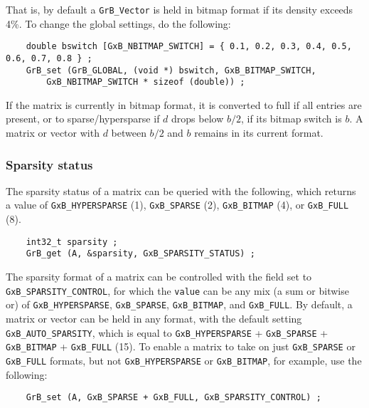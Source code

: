 That is, by default a \verb'GrB_Vector' is held in bitmap format if its density
exceeds 4\%.  To change the global settings, do the following:

{\footnotesize
\begin{verbatim}
    double bswitch [GxB_NBITMAP_SWITCH] = { 0.1, 0.2, 0.3, 0.4, 0.5, 0.6, 0.7, 0.8 } ;
    GrB_set (GrB_GLOBAL, (void *) bswitch, GxB_BITMAP_SWITCH,
        GxB_NBITMAP_SWITCH * sizeof (double)) ;
\end{verbatim}
}

If the matrix is currently in bitmap format, it is converted to full if all
entries are present, or to sparse/hypersparse if $d$ drops below $b/2$, if its
bitmap switch is $b$.  A matrix or vector with $d$ between $b/2$ and $b$
remains in its current format.

\subsubsection{Sparsity status}
\label{sparsity_status}

The sparsity status of a matrix can be queried with the following, which
returns a value of \verb'GxB_HYPERSPARSE' (1), \verb'GxB_SPARSE' (2),
\verb'GxB_BITMAP' (4), or \verb'GxB_FULL' (8).

{\footnotesize
\begin{verbatim}
    int32_t sparsity ;
    GrB_get (A, &sparsity, GxB_SPARSITY_STATUS) ; \end{verbatim}}

The sparsity format of a matrix can be controlled with the field set to
\verb'GxB_SPARSITY_CONTROL', for which the \verb'value' can be any mix (a sum or bitwise
or) of \verb'GxB_HYPERSPARSE', \verb'GxB_SPARSE', \verb'GxB_BITMAP', and
\verb'GxB_FULL'.  By default, a matrix or vector can be held in any format,
with the default setting \verb'GxB_AUTO_SPARSITY', which is equal to
\verb'GxB_HYPERSPARSE' + \verb'GxB_SPARSE' + \verb'GxB_BITMAP' +
\verb'GxB_FULL' (15).  To enable a matrix to take on just \verb'GxB_SPARSE' or
\verb'GxB_FULL' formats, but not \verb'GxB_HYPERSPARSE' or \verb'GxB_BITMAP',
for example, use the following:

{\footnotesize
\begin{verbatim}
    GrB_set (A, GxB_SPARSE + GxB_FULL, GxB_SPARSITY_CONTROL) ; \end{verbatim}}

